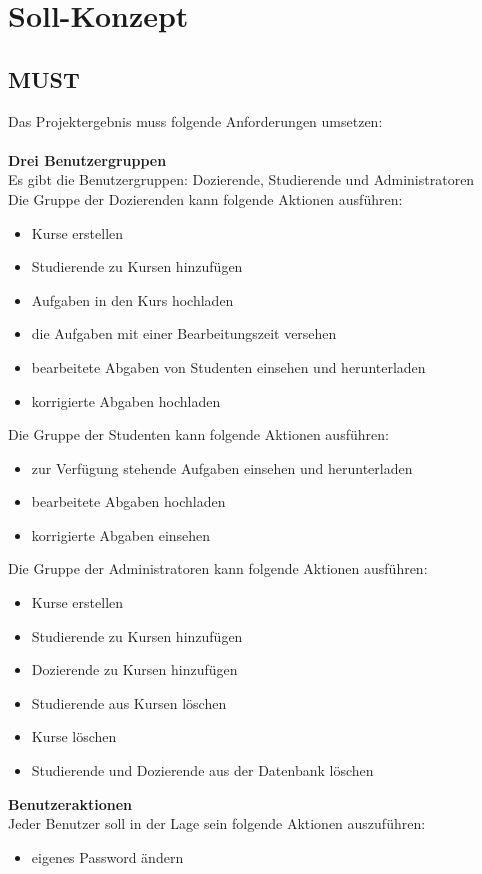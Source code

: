 
\chapter{Soll-Konzept}
\section{MUST}
Das Projektergebnis muss folgende Anforderungen umsetzen: \\ \\
\textbf{Drei Benutzergruppen} \\
Es gibt die Benutzergruppen: Dozierende, Studierende und Administratoren \\
Die Gruppe der Dozierenden kann folgende Aktionen ausführen: 
\begin{itemize}
\item Kurse erstellen
\item Studierende zu Kursen hinzufügen 
\item Aufgaben in den Kurs hochladen
\item die Aufgaben mit einer Bearbeitungszeit versehen
\item bearbeitete Abgaben von Studenten einsehen und herunterladen
\item korrigierte Abgaben hochladen
\end{itemize}
Die Gruppe der Studenten kann folgende Aktionen ausführen:
\begin{itemize}
\item zur Verfügung stehende Aufgaben einsehen und herunterladen
\item bearbeitete Abgaben hochladen
\item korrigierte Abgaben einsehen
\end{itemize}
Die Gruppe der Administratoren kann folgende Aktionen ausführen:
\begin{itemize}
\item Kurse erstellen
\item Studierende zu Kursen hinzufügen
\item Dozierende zu Kursen hinzufügen
\item Studierende aus Kursen löschen
\item Kurse löschen
\item Studierende und Dozierende aus der Datenbank löschen
\end{itemize}

\textbf{Benutzeraktionen} \\
Jeder Benutzer soll in der Lage sein folgende Aktionen auszuführen:
\begin{itemize}
\item eigenes Password ändern
\end{itemize}

